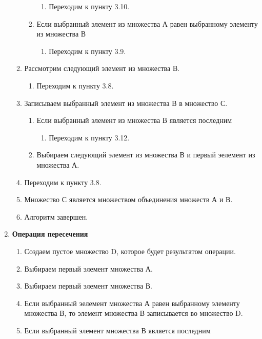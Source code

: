 \documentclass[a4paper,12pt]{extarticle}
\begin{document}
\begin{enumerate}
\begin{enumerate}[label*=\arabic*.]
\begin{enumerate}[label*=\arabic*.]
\begin{enumerate}[label*=\arabic*.]
        \item Переходим к пункту 3.10.
      \end{enumerate}
      \item Если выбранный элемент из множества А равен выбранному элементу из множества В
      \begin{enumerate}[label*=\arabic*.]
        \item Переходим к пункту 3.9.
      \end{enumerate}
    \end{enumerate}
    \item Рассмотрим следующий элемент из множества В.
    \begin{enumerate}[label*=\arabic*.]
      \item Переходим к пункту 3.8.
    \end{enumerate}
    \item Записываем выбранный элемент из множества В в множество С.
    \begin{enumerate}[label*=\arabic*.]
      \item Если выбранный элемент из множества В является последним
      \begin{enumerate}[label*=\arabic*.]
        \item Переходим к пункту 3.12.
      \end{enumerate}
      \item Выбираем следующий элемент из множества В и первый эелемент из множества А.
    \end{enumerate}
    \item Переходим к пункту 3.8.
    \item Множество С является множеством объединения множеств А и В.
    \item Алгоритм завершен.
  \end{enumerate}
  \item \textbf{Операция пересечения}
  \begin{enumerate}[label*=\arabic*.]
    \item Создаем пустое множество D, которое будет результатом операции.
    \item Выбираем первый элемент множества А.
    \item Выбираем первый элемент множества В.
    \item Если выбранный эелемент множества А равен выбранному элементу множества В, то элемент множества В записывается во множество D.
    \item Если выбранный элемент множества В является последним

\end{enumerate}
\end{enumerate}
\end{document}
